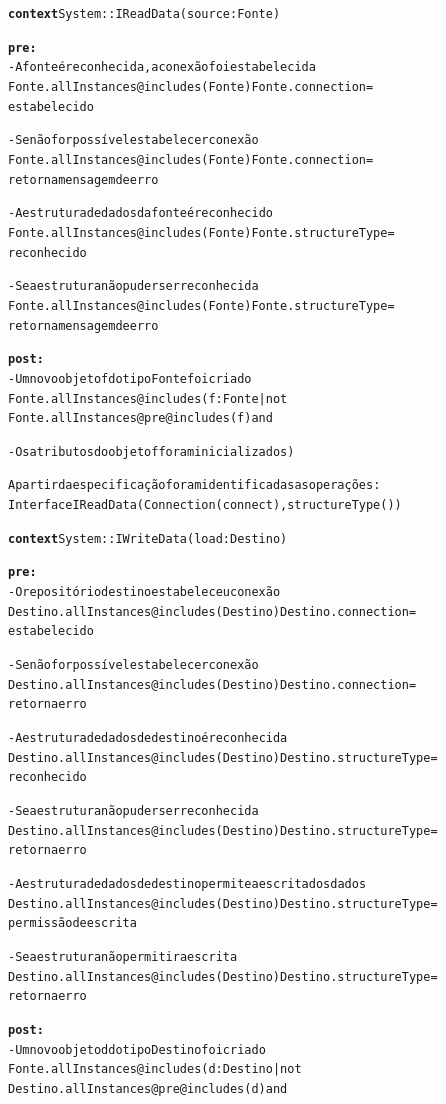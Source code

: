 \begin{alltt}
	
\hrulefill	
\textbf{context} System :: IReadData (source : Fonte)

\textbf{pre:}
- A fonte é reconhecida, a conexão foi estabelecida	
Fonte.allInstances@includes(Fonte) Fonte.connection =
 estabelecido	
 
- Se não for possível estabelecer conexão
Fonte.allInstances@includes(Fonte) Fonte.connection = 
retorna mensagem de erro

- A estrutura de dados da fonte é reconhecido
Fonte.allInstances@includes(Fonte) Fonte.structureType = 
reconhecido

- Se a estrutura não puder ser reconhecida
Fonte.allInstances@includes(Fonte)Fonte.structureType = 
retorna mensagem de erro

\textbf{post:}
- Um novo objeto f do tipo Fonte foi criado
Fonte. allInstances@includes (f: Fonte | not 
Fonte.allInstances@pre@includes (f) and

- Os atributos do objeto f foram inicializados)	
\hrulefill

\textnormal{A partir da especificação foram identificadas as operações:		
Interface IReadData(Connection(connect), structureType())}

\hrulefill
\textbf{context} System :: IWriteData (load : Destino)

\textbf{pre:}
- O repositório destino estabeleceu conexão
Destino.allInstances@includes(Destino) Destino.connection = 
estabelecido

- Se não for possível estabelecer conexão
Destino.allInstances@includes(Destino) Destino.connection = 
retorna  erro

- A estrutura de dados de destino é reconhecida
Destino.allInstances@includes(Destino) Destino.structureType = 
reconhecido

- Se a estrutura não puder ser reconhecida
Destino.allInstances@includes(Destino)Destino.structureType = 
retorna  erro

- A estrutura de dados de destino permite a escrita dos dados
Destino.allInstances@includes(Destino) Destino.structureType = 
permissão de escrita

- Se a estrutura não permitir a escrita
Destino.allInstances@includes(Destino)Destino.structureType = 
retorna  erro

\textbf{post:}
- Um novo objeto d do tipo Destino foi criado
Fonte. allInstances@includes (d: Destino | not 
Destino.allInstances@pre@includes (d) and


\end{alltt}
